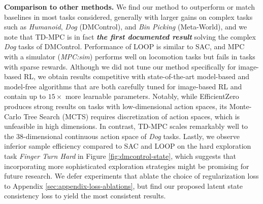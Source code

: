 \documentclass{article}
\begin{document}
\textbf{Comparison to other methods.} We find our method to outperform or match baselines in most tasks considered, generally with larger gains on complex tasks such as \emph{Humanoid}, \emph{Dog} (DMControl), and \emph{Bin Picking} (Meta-World), and we note that TD-MPC is in fact \emph{\textbf{the first documented result}} solving the complex \emph{Dog} tasks of DMControl. Performance of LOOP is similar to SAC, and MPC with a simulator (\textit{MPC:sim}) performs well on locomotion tasks but fails in tasks with sparse rewards. Although we did not tune our method specifically for image-based RL, we obtain results competitive with state-of-the-art model-based and model-free algorithms that are both carefully tuned for image-based RL and contain up to $15\times$ more learnable parameters. Notably, while EfficientZero produces strong results on tasks with low-dimensional action spaces, its Monte-Carlo Tree Search (MCTS) requires discretization of action spaces, which is unfeasible in high dimensions. In contrast, TD-MPC scales remarkably well to the 38-dimensional continuous action space of \emph{Dog} tasks. Lastly, we observe inferior sample efficiency compared to SAC and LOOP on the hard exploration task \textit{Finger Turn Hard} in Figure \ref{fig:dmcontrol-state}, which suggests that incorporating more sophisticated exploration strategies might be promising for future research. We defer experiments that ablate the choice of regularization loss to Appendix \ref{sec:appendix-loss-ablations}, but find our proposed latent state consistency loss to yield the most consistent results.
\end{document}
